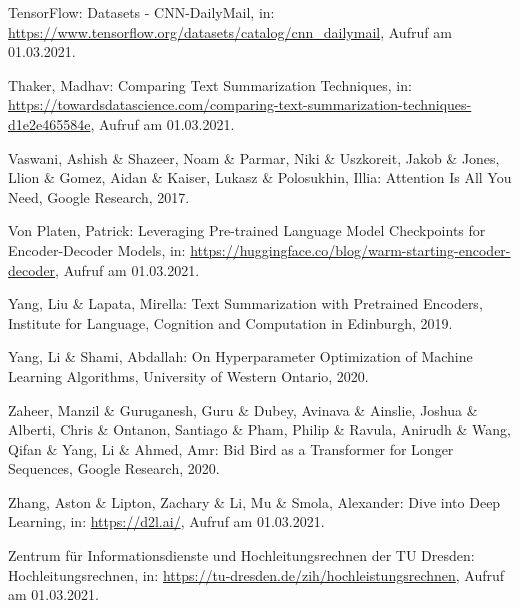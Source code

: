 \begin{thebibliography}{85}
TensorFlow: Datasets - CNN-DailyMail, in: \url{https://www.tensorflow.org/datasets/catalog/cnn_dailymail}, Aufruf am 01.03.2021.

Thaker, Madhav: Comparing Text Summarization Techniques, in: \url{https://towardsdatascience.com/comparing-text-summarization-techniques-d1e2e465584e}, Aufruf am 01.03.2021.

Vaswani, Ashish \& Shazeer, Noam \& Parmar, Niki \& Uszkoreit, Jakob \& Jones, Llion \& Gomez, Aidan \& Kaiser, Lukasz \& Polosukhin, Illia: Attention Is All You Need, Google Research, 2017.

Von Platen, Patrick: Leveraging Pre-trained Language Model Checkpoints for Encoder-Decoder Models, in: \url{https://huggingface.co/blog/warm-starting-encoder-decoder}, Aufruf am 01.03.2021.

Yang, Liu \& Lapata, Mirella: Text Summarization with Pretrained Encoders, Institute for Language, Cognition and Computation in Edinburgh, 2019.

Yang, Li \& Shami, Abdallah: On Hyperparameter Optimization of Machine Learning Algorithms, University of Western Ontario, 2020.

Zaheer, Manzil \& Guruganesh, Guru \& Dubey, Avinava \& Ainslie, Joshua \& Alberti, Chris \& Ontanon, Santiago \& Pham, Philip \& Ravula, Anirudh \& Wang, Qifan \& Yang, Li \& Ahmed, Amr: Bid Bird as a Transformer for Longer Sequences, Google Research, 2020.

Zhang, Aston \& Lipton, Zachary \& Li, Mu \& Smola, Alexander: Dive into Deep Learning, in: \url{https://d2l.ai/}, Aufruf am 01.03.2021.

Zentrum für Informationsdienste und Hochleitungsrechnen der TU Dresden: Hochleitungsrechnen, in: \url{https://tu-dresden.de/zih/hochleistungsrechnen}, Aufruf am 01.03.2021.

\end{thebibliography}
